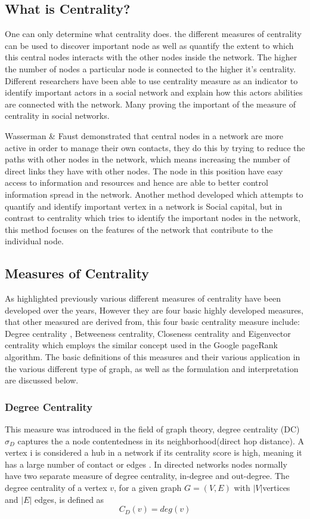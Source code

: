 \subsection{What is Centrality?}
One can only determine what centrality does\cite{freemanDevelopment}. the different measures of centrality can be used to discover important node as well as quantify the extent to which this central nodes interacts with the other nodes inside the network. The higher the number of nodes a particular node is connected to the higher it's centrality\cite{bonacich1987power}.
Different researchers have been able to use centrality measure as an indicator to identify important actors in a social network and explain how this actors abilities are connected with the network\cite{burt1997contingent}. Many proving the important of the measure of centrality in social networks. 

Wasserman \& Faust demonstrated that central nodes in a network are more active in order to manage their own contacts, they do this by trying to reduce the paths with other nodes in the network, which means increasing the number of direct links they have with other nodes. The node in this position have easy access to information and resources and hence are able to better control information spread in the network. Another method developed which attempts to quantify and identify important vertex in a network is Social capital, but in contrast to centrality  which tries to identify the important nodes in the network, this method focuses on the features of the network that contribute to the individual node\cite{borgatti2006identifying}.

\subsection{Measures of Centrality}
As highlighted previously various different measures of centrality have been developed over the years, However they are four basic highly developed measures, that other measured are derived from, this four basic centrality measure include: Degree centrality , Betweeness centrality, Closeness centrality and Eigenvector centrality which employs the similar concept used in the Google pageRank algorithm. The basic definitions of this measures and their various application in the various different type of graph, as well as the formulation and interpretation are discussed below.

\subsubsection{Degree Centrality}
This measure was introduced in the field of graph theory, degree centrality (DC)  ${\sigma_D}$ captures the a node contentedness in its neighborhood(direct hop distance). A vertex i is considered a hub in a network if its centrality score is high, meaning it has a large number of contact or edges \cite{freemanDevelopment}. In directed networks nodes normally have two separate measure of degree centrality, in-degree and out-degree.  The degree centrality of a vertex ${v}$, for a given graph ${G = (V, E)}$ with ${|V|} $vertices and ${|E|}$ edges, is defined as 
$${C_D(v) = deg(v)}$$ 

